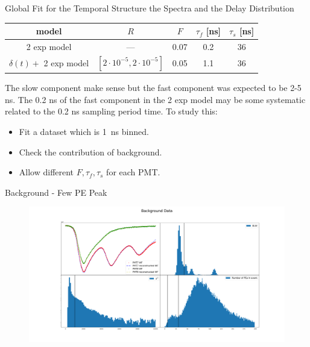 \documentclass{beamer}
\begin{document}
\begin{frame}{Global Fit for the Temporal Structure the Spectra and the Delay Distribution}
\begin{center}
\begin{tabular}{|c|c|c|c|c|} 
\hline
model &$R$ & $F$ & $\tau_f$ [ns] & $\tau_s$ [ns]\\ 
\hline\hline
2 exp model &--- & 0.07 & 0.2 & 36\\
\hline
$\delta(t)+$ 2 exp model& $[2\cdot10^{-5}, 2\cdot10^{-5}]$ & 0.05 & 1.1 & 36\\
\hline
\end{tabular}
\end{center} 
The slow component make sense but the fast component was expected to be 2-5 ns. The 0.2 ns of the fast component in the 2 exp model may be some systematic related to the 0.2 ns sampling period time.
To study this:
\begin{itemize}
\item Fit a dataset which is 1~ns binned.
\item Check the contribution of background.
\item Allow different $F, \tau_f, \tau_s$ for each PMT. 
\end{itemize}

\end{frame}

\begin{frame}{Background - Few PE Peak}
\begin{figure}[h]
\includegraphics[width=1\textwidth]{BG.png}
\end{figure}
\end{frame}
\end{document}
